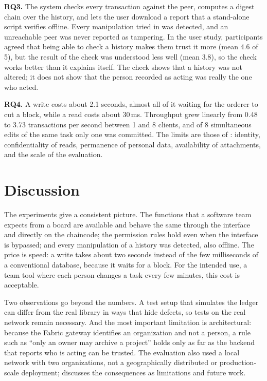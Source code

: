 \textbf{RQ3.} The system checks every transaction against the peer, computes a digest chain over the history, and lets the user download a report that a stand-alone script verifies offline. Every manipulation tried in  was detected, and an unreachable peer was never reported as tampering. In the user study, participants agreed that being able to check a history makes them trust it more (mean 4.6 of 5), but the result of the check was understood less well (mean 3.8), so the check works better than it explains itself. The check shows that a history was not altered; it does not show that the person recorded as acting was really the one who acted.

\textbf{RQ4.} A write costs about 2.1 seconds, almost all of it waiting for the orderer to cut a block, while a read costs about 30\,ms. Throughput grew linearly from 0.48 to 3.73 transactions per second between 1 and 8 clients, and of 8 simultaneous edits of the same task only one was committed. The limits are those of : identity, confidentiality of reads, permanence of personal data, availability of attachments, and the scale of the evaluation.

\section{Discussion}
\label{sec:results-discussion}

The experiments give a consistent picture. The functions that a software team expects from a board are available and behave the same through the interface and directly on the chaincode; the permission rules hold even when the interface is bypassed; and every manipulation of a history was detected, also offline. The price is speed: a write takes about two seconds instead of the few milliseconds of a conventional database, because it waits for a block. For the intended use, a team tool where each person changes a task every few minutes, this cost is acceptable.

Two observations go beyond the numbers. A test setup that simulates the ledger can differ from the real library in ways that hide defects, so tests on the real network remain necessary. And the most important limitation is architectural: because the Fabric gateway identifies an organization and not a person, a rule such as ``only an owner may archive a project'' holds only as far as the backend that reports who is acting can be trusted. The evaluation also used a local network with two organizations, not a geographically distributed or production-scale deployment;  discusses the consequences as limitations and future work.
